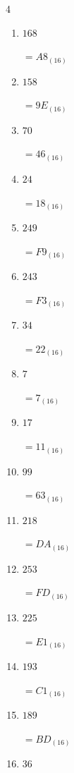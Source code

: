 \begin{multicols}{4}
\begin{enumerate}
        $=A9_{(16)}$

  \item $168$

        $=A8_{(16)}$

  \item $158$

        $=9E_{(16)}$

  \item $70$

        $=46_{(16)}$

  \item $24$

        $=18_{(16)}$

  \item $249$

        $=F9_{(16)}$

  \item $243$

        $=F3_{(16)}$

  \item $34$

        $=22_{(16)}$

  \item $7$

        $=7_{(16)}$

\columnbreak %

\resetques

  \item $17$

        $=11_{(16)}$

  \item $99$

        $=63_{(16)}$

  \item $218$

        $=DA_{(16)}$

  \item $253$

        $=FD_{(16)}$

  \item $225$

        $=E1_{(16)}$

  \item $193$

        $=C1_{(16)}$

  \item $189$

        $=BD_{(16)}$

  \item $36$


\end{enumerate}
\end{multicols}
